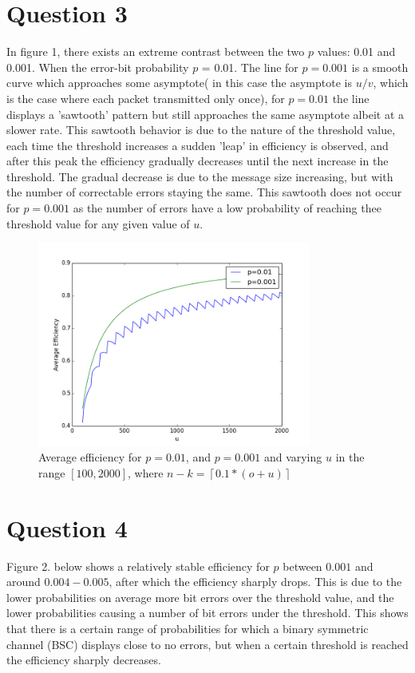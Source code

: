 \documentclass{article}
\begin{document}
\section*{Question 3}
In figure 1, there exists an extreme
contrast between the two $p$ values: 0.01 and 0.001. When the error-bit
probability $p$ = 0.01. The line for $p = 0.001$ is a smooth curve which approaches some asymptote(
in this case the asymptote is $u/v$, which is the case where each packet transmitted only once),
for $p = 0.01$ the line displays a 'sawtooth' pattern but still approaches the same asymptote albeit at a
slower rate. This sawtooth behavior is due to the nature of the threshold value, each time the threshold
increases a sudden 'leap' in efficiency is observed, and after this peak the efficiency gradually decreases
until the next increase in the threshold. The gradual decrease is due to the message size increasing, but with 
the number of correctable errors staying the same. This sawtooth does not occur for $p=0.001$ as the number of
errors have a low probability of reaching thee threshold value for any given value of $u$.


\begin{figure}[H]
    \centering
    \includegraphics[width=0.8\textwidth]{q3.png}
    \caption{Average efficiency for $p=0.01$, and $p=0.001$ and varying $u$ in the range $[100, 2000]$, where $n-k = \left \lceil{0.1 * (o + u)}\right \rceil$}
    \label{fig:awesome_image}
\end{figure}



\section*{Question 4}
Figure 2. below shows a relatively stable efficiency for $p$ between $0.001$ and around $0.004-0.005$,
after which the efficiency sharply drops. This is due to the lower probabilities on average more bit errors
over the threshold value, and the lower probabilities causing a number of bit errors under the threshold.
This shows that there is a certain range of probabilities for which a binary symmetric channel (BSC)
displays close to no errors, but when a certain threshold is reached the efficiency sharply decreases.
\end{document}
